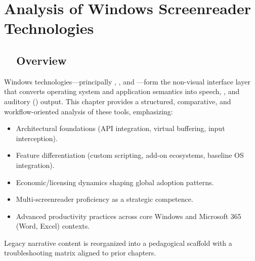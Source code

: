 \chapter{Analysis of Windows Screenreader Technologies}
\label{chap:windows-screenreader-analysis}

\section{~~Overview}
\label{sec:sr25-overview}
Windows  technologies—principally , , and —form the non-visual interface layer that converts operating system and application semantics into speech, , and auditory () output. This chapter provides a structured, comparative, and workflow-oriented analysis of these tools, emphasizing:
\begin{itemize}
	\item Architectural foundations (API integration, virtual buffering, input interception).
	\item Feature differentiation (custom scripting, add-on ecosystems, baseline OS integration).
	\item Economic/licensing dynamics shaping global adoption patterns.
	\item Multi-screenreader proficiency as a strategic competence.
	\item Advanced productivity practices across core Windows and Microsoft 365 (Word, Excel) contexts.
\end{itemize}
Legacy narrative content is reorganized into a pedagogical scaffold with a troubleshooting matrix aligned to prior chapters.

